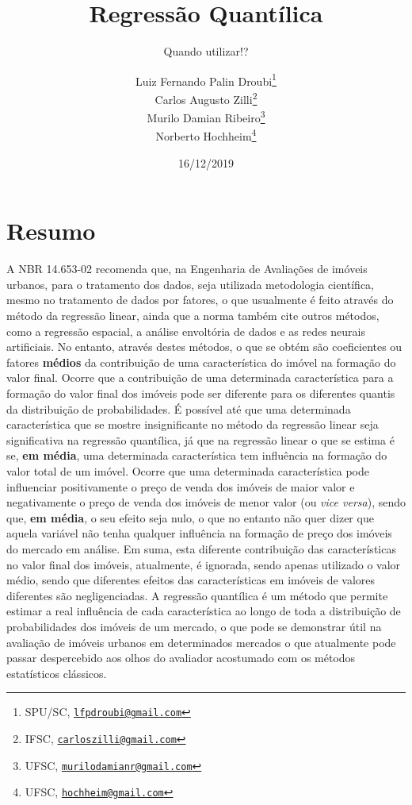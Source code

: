 \documentclass[a4paper, 12pt]{article}
\title{Regressão Quantílica}
\subtitle{Quando utilizar!?}
\author{Luiz Fernando Palin Droubi\footnote{SPU/SC,
  \href{mailto:lfpdroubi@gmail.com}{\nolinkurl{lfpdroubi@gmail.com}}} \\ Carlos Augusto Zilli\footnote{IFSC,
  \href{mailto:carloszilli@gmail.com}{\nolinkurl{carloszilli@gmail.com}}} \\ Murilo Damian Ribeiro\footnote{UFSC,
  \href{mailto:murilodamianr@gmail.com}{\nolinkurl{murilodamianr@gmail.com}}
} \\ Norberto Hochheim\footnote{UFSC,
  \href{mailto:hochheim@gmail.com}{\nolinkurl{hochheim@gmail.com}}}}
\date{16/12/2019}
\begin{document}
\maketitle

\hypertarget{resumo}{%
\section*{Resumo}\label{resumo}}

A NBR 14.653-02 recomenda que, na Engenharia de Avaliações de imóveis
urbanos, para o tratamento dos dados, seja utilizada metodologia
científica, mesmo no tratamento de dados por fatores, o que usualmente é
feito através do método da regressão linear, ainda que a norma também
cite outros métodos, como a regressão espacial, a análise envoltória de
dados e as redes neurais artificiais. No entanto, através destes
métodos, o que se obtém são coeficientes ou fatores \textbf{médios} da
contribuição de uma característica do imóvel na formação do valor final.
Ocorre que a contribuição de uma determinada característica para a
formação do valor final dos imóveis pode ser diferente para os
diferentes quantis da distribuição de probabilidades. É possível até que
uma determinada característica que se mostre insignificante no método da
regressão linear seja significativa na regressão quantílica, já que na
regressão linear o que se estima é se, \textbf{em média}, uma
determinada característica tem influência na formação do valor total de
um imóvel. Ocorre que uma determinada característica pode influenciar
positivamente o preço de venda dos imóveis de maior valor e
negativamente o preço de venda dos imóveis de menor valor (ou \emph{vice
versa}), sendo que, \textbf{em média}, o seu efeito seja nulo, o que no
entanto não quer dizer que aquela variável não tenha qualquer influência
na formação de preço dos imóveis do mercado em análise. Em suma, esta
diferente contribuição das características no valor final dos imóveis,
atualmente, é ignorada, sendo apenas utilizado o valor médio, sendo que
diferentes efeitos das características em imóveis de valores diferentes
são negligenciadas. A regressão quantílica é um método que permite
estimar a real influência de cada característica ao longo de toda a
distribuição de probabilidades dos imóveis de um mercado, o que pode se
demonstrar útil na avaliação de imóveis urbanos em determinados mercados
o que atualmente pode passar despercebido aos olhos do avaliador
acostumado com os métodos estatísticos clássicos.
\end{document}
